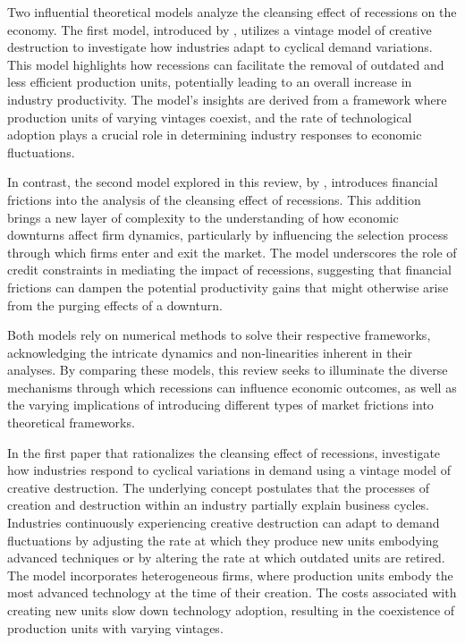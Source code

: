 
Two influential theoretical models analyze the cleansing effect of recessions on the economy. The first model,
introduced by \cite{CabHarm94}, utilizes a vintage model of creative destruction to investigate how industries adapt to
cyclical demand variations. This model highlights how recessions can facilitate the removal of outdated and less
efficient production units, potentially leading to an overall increase in industry productivity. The model's insights
are derived from a framework where production units of varying vintages coexist, and the rate of technological adoption
plays a crucial role in determining industry responses to economic fluctuations.
\par

In contrast, the second model explored in this review, by \cite{OsePap17}, introduces financial frictions into the
analysis of the cleansing effect of recessions. This addition brings a new layer of complexity to the understanding of
how economic downturns affect firm dynamics, particularly by influencing the selection process through which firms enter
and exit the market. The model underscores the role of credit constraints in mediating the impact of recessions,
suggesting that financial frictions can dampen the potential productivity gains that might otherwise arise from the
purging effects of a downturn.
\par

Both models rely on numerical methods to solve their respective frameworks, acknowledging the intricate dynamics and
non-linearities inherent in their analyses. By comparing these models, this review seeks to illuminate the diverse
mechanisms through which recessions can influence economic outcomes, as well as the varying implications of introducing
different types of market frictions into theoretical frameworks.

\par
In the first paper that rationalizes the cleansing effect of recessions, \cite{CabHarm94} investigate how industries
respond to cyclical variations in demand using a vintage model of creative destruction. The underlying concept
postulates that the processes of creation and destruction within an industry partially explain business cycles.
Industries continuously experiencing creative destruction can adapt to demand fluctuations by adjusting the rate at
which they produce new units embodying advanced techniques or by altering the rate at which outdated units are retired.
The model incorporates heterogeneous firms, where production units embody the most advanced technology at the time of
their creation. The costs associated with creating new units slow down technology adoption, resulting in the coexistence
of production units with varying vintages.
\par

